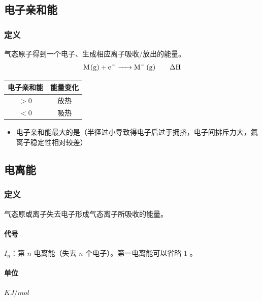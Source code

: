 \documentclass[a4paper]{article}
\begin{document}
	
	\subsection{电子亲和能}
	\subsubsection{定义}
	气态原子得到一个电子、生成相应离子吸收/放出的能量。
	$$\ce{M(g) + e- -> M- (g)\qquad \Delta H}$$
	\begin{tabular}{|c|c|}
	\hline
	电子亲和能 & 能量变化\\\hline
	$>0$ & 放热\\\hline
	$<0$ & 吸热\\\hline
	\end{tabular}
	\begin{itemize}
		\item 电子亲和能最大的是（半径过小导致得电子后过于拥挤，电子间排斥力大，氟离子稳定性相对较差）
	\end{itemize}
	
	
	\subsection{电离能}
	\subsubsection{定义}
	气态原或离子失去电子形成气态离子所吸收的能量。
	\paragraph{代号}
	$I_n$：第 $n$ 电离能（失去 $n$ 个电子）。第一电离能可以省略 $1$ 。
	\paragraph{单位}
	$KJ/mol$
\end{document}
